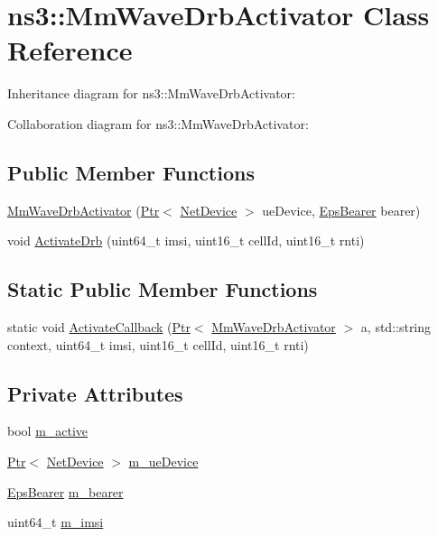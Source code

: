\hypertarget{classns3_1_1MmWaveDrbActivator}{}\section{ns3\+:\+:Mm\+Wave\+Drb\+Activator Class Reference}
\label{classns3_1_1MmWaveDrbActivator}


Inheritance diagram for ns3\+:\+:Mm\+Wave\+Drb\+Activator\+:


Collaboration diagram for ns3\+:\+:Mm\+Wave\+Drb\+Activator\+:
\subsection*{Public Member Functions}
\begin{DoxyCompactItemize}
\item 
\hyperlink{classns3_1_1MmWaveDrbActivator_ae14af25eebc2d740c692b8ee8a9dab81}{Mm\+Wave\+Drb\+Activator} (\hyperlink{classns3_1_1Ptr}{Ptr}$<$ \hyperlink{classns3_1_1NetDevice}{Net\+Device} $>$ ue\+Device, \hyperlink{structns3_1_1EpsBearer}{Eps\+Bearer} bearer)
\item 
void \hyperlink{classns3_1_1MmWaveDrbActivator_a7c7f2d4c6cd53ffbff8f7dcaa4a585a6}{Activate\+Drb} (uint64\+\_\+t imsi, uint16\+\_\+t cell\+Id, uint16\+\_\+t rnti)
\end{DoxyCompactItemize}
\subsection*{Static Public Member Functions}
\begin{DoxyCompactItemize}
\item 
static void \hyperlink{classns3_1_1MmWaveDrbActivator_a8f4fae479e87f1a4415247e112df51e8}{Activate\+Callback} (\hyperlink{classns3_1_1Ptr}{Ptr}$<$ \hyperlink{classns3_1_1MmWaveDrbActivator}{Mm\+Wave\+Drb\+Activator} $>$ a, std\+::string context, uint64\+\_\+t imsi, uint16\+\_\+t cell\+Id, uint16\+\_\+t rnti)
\end{DoxyCompactItemize}
\subsection*{Private Attributes}
\begin{DoxyCompactItemize}
\item 
bool \hyperlink{classns3_1_1MmWaveDrbActivator_a2b02d9ef64fb9fc16db808a6667bab4b}{m\+\_\+active}
\item 
\hyperlink{classns3_1_1Ptr}{Ptr}$<$ \hyperlink{classns3_1_1NetDevice}{Net\+Device} $>$ \hyperlink{classns3_1_1MmWaveDrbActivator_a3685adbe2aad9296a29a7d1fbf42546d}{m\+\_\+ue\+Device}
\item 
\hyperlink{structns3_1_1EpsBearer}{Eps\+Bearer} \hyperlink{classns3_1_1MmWaveDrbActivator_a7bc0456aed6a35aa66b25514ec6ca4e6}{m\+\_\+bearer}
\item 
uint64\+\_\+t \hyperlink{classns3_1_1MmWaveDrbActivator_aebc672ea56bcc8c4fb28ec64e4d19ac1}{m\+\_\+imsi}
\end{DoxyCompactItemize}


